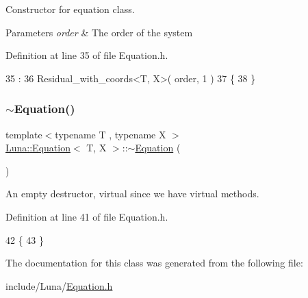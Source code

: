 Constructor for equation class. 


\begin{DoxyParams}{Parameters}
{\em order} & The order of the system \\
\hline
\end{DoxyParams}


Definition at line 35 of file Equation.\+h.


\begin{DoxyCode}
35                                                   :
36       Residual\_with\_coords<T, X>( order, 1 )
37   \{
38   \}
\end{DoxyCode}
\mbox{\label{classLuna_1_1Equation_accb94fee3ccd30bc1075374c4b257564}} 
\subsubsection{\texorpdfstring{$\sim$\+Equation()}{~Equation()}}
{\footnotesize\ttfamily template$<$typename T , typename X $>$ \\
\hyperlink{classLuna_1_1Equation}{Luna\+::\+Equation}$<$ T, X $>$\+::$\sim$\hyperlink{classLuna_1_1Equation}{Equation} (\begin{DoxyParamCaption}{ }\end{DoxyParamCaption})\hspace{0.3cm}{\ttfamily [virtual]}}



An empty destructor, virtual since we have virtual methods. 



Definition at line 41 of file Equation.\+h.


\begin{DoxyCode}
42   \{
43   \}
\end{DoxyCode}


The documentation for this class was generated from the following file\+:\begin{DoxyCompactItemize}
\item 
include/\+Luna/\hyperlink{Equation_8h}{Equation.\+h}\end{DoxyCompactItemize}
